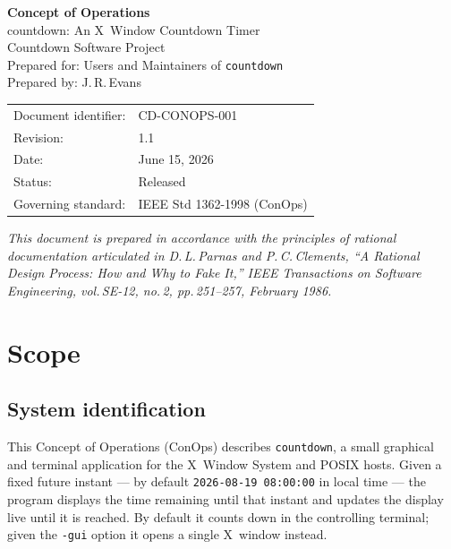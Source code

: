 \documentclass[12pt]{article}
\newcommand{\code}[1]{\texttt{#1}}
\begin{document}
\begin{titlepage}
  \centering
  \vspace*{2cm}
  {\Huge\bfseries\color{cdteal} Concept of Operations\\[0.5em]}
  {\Large countdown: An X~Window Countdown Timer}\\[2em]
  {\large Countdown Software Project}\\[0.5em]
  {\normalsize Prepared for: Users and Maintainers of \code{countdown}}\\[0.5em]
  {\normalsize Prepared by: J.\,R.\,Evans}\\[2em]
  \begin{tabular}{ll}
    Document identifier: & CD-CONOPS-001                                  \\
    Revision:            & 1.1                                            \\
    Date:                & June 15, 2026                                  \\
    Status:              & Released                                       \\
    Governing standard:  & IEEE Std 1362-1998 (ConOps)                    \\
  \end{tabular}
  \vfill
  {\small\textit{This document is prepared in accordance with the
  principles of rational documentation articulated in
  D.\,L.\,Parnas and P.\,C.\,Clements, ``A Rational Design Process:
  How and Why to Fake It,'' \textit{IEEE Transactions on Software
  Engineering}, vol.\,SE-12, no.\,2, pp.\,251--257, February 1986.}}
\end{titlepage}

\tableofcontents
\clearpage

\section{Scope}

\subsection{System identification}

This Concept of Operations (ConOps) describes \code{countdown}, a small
graphical and terminal application for the X~Window System and POSIX
hosts.  Given a fixed future instant --- by default \code{2026-08-19
08:00:00} in local time --- the program displays the time remaining until
that instant and updates the display live until it is reached.  By default
it counts down in the controlling terminal; given the \code{-gui} option it
opens a single X~window instead.
\end{document}
